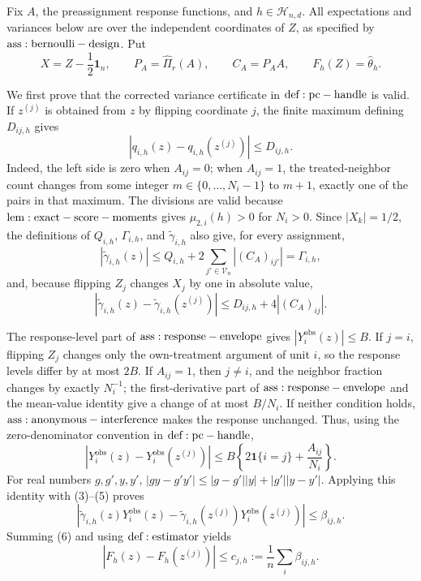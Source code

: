 Fix \(A\), the preassignment response functions, and \(h\in\mathcal H_{n,d}\).  All expectations and variances below are over the independent coordinates of \(Z\), as specified by \({\rm ass:bernoulli-design}\).  Put
\[
 X=Z-\frac12\mathbf1_n,\qquad P_A=\widehat\Pi_r(A),\qquad C_A=P_AA,
 \qquad F_h(Z)=\widehat\theta_h.
\tag{1}
\]

We first prove that the corrected variance certificate in \({\rm def:pc-handle}\) is valid.  If \(z^{(j)}\) is obtained from \(z\) by flipping coordinate \(j\), the finite maximum defining \(D_{ij,h}\) gives
\[
 |q_{i,h}(z)-q_{i,h}(z^{(j)})|\le D_{ij,h}.
\tag{2}
\]
Indeed, the left side is zero when \(A_{ij}=0\); when \(A_{ij}=1\), the treated-neighbor count changes from some integer \(m\in\{0,\ldots,N_i-1\}\) to \(m+1\), exactly one of the pairs in that maximum.  The divisions are valid because \({\rm lem:exact-score-moments}\) gives \(\mu_{2,i}(h)>0\) for \(N_i>0\).  Since \(|X_k|=1/2\), the definitions of \(Q_{i,h}\), \(\Gamma_{i,h}\), and \(\widetilde\gamma_{i,h}\) also give, for every assignment,
\[
 |\widetilde\gamma_{i,h}(z)|
 \le Q_{i,h}+2\sum_{j'\in\mathcal V_n}|(C_A)_{ij'}|
 =\Gamma_{i,h},
\tag{3}
\]
and, because flipping \(Z_j\) changes \(X_j\) by one in absolute value,
\[
 |\widetilde\gamma_{i,h}(z)-\widetilde\gamma_{i,h}(z^{(j)})|
 \le D_{ij,h}+4|(C_A)_{ij}|.
\tag{4}
\]

The response-level part of \({\rm ass:response-envelope}\) gives \(|Y_i^{\mathrm{obs}}(z)|\le B\).  If \(j=i\), flipping \(Z_j\) changes only the own-treatment argument of unit \(i\), so the response levels differ by at most \(2B\).  If \(A_{ij}=1\), then \(j\ne i\), and the neighbor fraction changes by exactly \(N_i^{-1}\); the first-derivative part of \({\rm ass:response-envelope}\) and the mean-value identity give a change of at most \(B/N_i\).  If neither condition holds, \({\rm ass:anonymous-interference}\) makes the response unchanged.  Thus, using the zero-denominator convention in \({\rm def:pc-handle}\),
\[
 |Y_i^{\mathrm{obs}}(z)-Y_i^{\mathrm{obs}}(z^{(j)})|
 \le B\left\{2\mathbf1\{i=j\}+\frac{A_{ij}}{N_i}\right\}.
\tag{5}
\]
For real numbers \(g,g',y,y'\), \(|gy-g'y'|\le |g-g'||y|+|g'||y-y'|\).  Applying this identity with (3)--(5) proves
\[
 \left|\widetilde\gamma_{i,h}(z)Y_i^{\mathrm{obs}}(z)
 -\widetilde\gamma_{i,h}(z^{(j)})Y_i^{\mathrm{obs}}(z^{(j)})\right|
 \le\beta_{ij,h}.
\tag{6}
\]
Summing (6) and using \({\rm def:estimator}\) yields
\[
 |F_h(z)-F_h(z^{(j)})|
 \le c_{j,h}:=\frac1n\sum_i\beta_{ij,h}.
\tag{7}
\]

